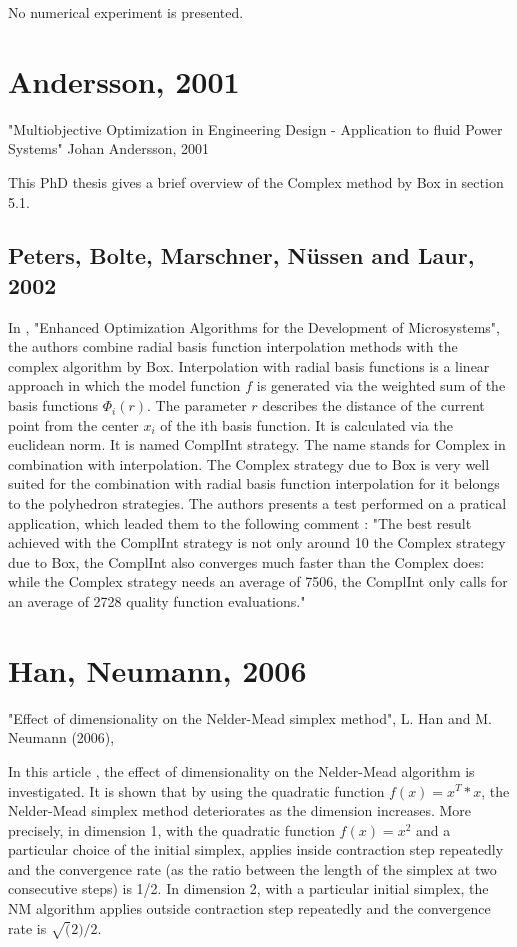 No numerical experiment is presented.

\section{Andersson, 2001}

"Multiobjective Optimization in Engineering Design - Application to fluid Power Systems"
Johan Andersson, 2001

This PhD thesis \cite{Andersson01multiobjectiveoptimization} gives a brief overview of the Complex method by Box in 
section 5.1.

\subsection{Peters, Bolte, Marschner, N\"{u}ssen and Laur, 2002}

In \cite{590075}, "Enhanced Optimization Algorithms for the Development of Microsystems", 
the authors combine radial basis function interpolation methods 
with the complex algorithm by Box.
Interpolation with radial basis functions is a linear approach
in which the model function $f$ is generated
via the weighted sum of the basis functions $\Phi_i(r)$.
The parameter $r$ describes the distance of the current
point from the center $x_i$ of the ith basis function. It is
calculated via the euclidean norm.
It is named ComplInt strategy. The name stands for
Complex in combination with interpolation. The Complex
strategy due to Box is very well suited for the
combination with radial basis function interpolation
for it belongs to the polyhedron strategies.
The authors presents a test performed on a pratical application, 
which leaded them to the following comment :
"The best result achieved with the ComplInt strategy
is not only around 10%
the Complex strategy due to Box, the ComplInt also
converges much faster than the Complex does: while
the Complex strategy needs an average of 7506, the
ComplInt only calls for an average of 2728 quality
function evaluations."


\section{Han, Neumann, 2006}

"Effect of dimensionality on the Nelder-Mead simplex method", 
L. Han and M. Neumann (2006), 


In this article \cite{HanNeumann2006}, the effect of dimensionality on the Nelder-Mead algorithm is 
investigated. It is shown that by using the quadratic function $f(x) = x^T*x$, 
the Nelder-Mead simplex method deteriorates as the dimension 
increases. More precisely, in dimension 1, with the quadratic function
$f(x) = x^2$ and a particular choice of the initial simplex, applies 
inside contraction step repeatedly and the convergence rate (as the 
ratio between the length of the simplex at two consecutive steps) is 1/2. 
In dimension 2, with a particular initial simplex, the NM algorithm 
applies outside contraction step repeatedly and the convergence rate is 
$\sqrt(2)/2$.

